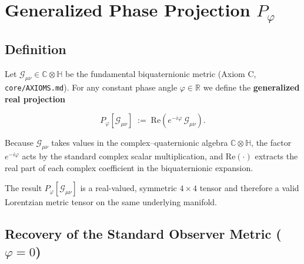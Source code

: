 

\section{Generalized Phase Projection $P_\varphi$}
\label{sec:canonical:phase_projection}

\subsection{Definition}

Let $\mathcal{G}_{\mu\nu} \in \mathbb{C} \otimes \mathbb{H}$ be the fundamental biquaternionic metric
(Axiom C, \texttt{core/AXIOMS.md}).  For any constant phase angle $\varphi \in \mathbb{R}$ we define
the \textbf{generalized real projection}

\begin{equation}
\label{eq:phase_projection_def}
\boxed{P_\varphi[\mathcal{G}_{\mu\nu}] \;:=\; \mathrm{Re}\!\left(e^{-i\varphi}\,\mathcal{G}_{\mu\nu}\right).}
\end{equation}

Because $\mathcal{G}_{\mu\nu}$ takes values in the complex–quaternionic algebra $\mathbb{C}\otimes\mathbb{H}$,
the factor $e^{-i\varphi}$ acts by the standard complex scalar multiplication, and $\mathrm{Re}(\cdot)$
extracts the real part of each complex coefficient in the biquaternionic expansion.

The result $P_\varphi[\mathcal{G}_{\mu\nu}]$ is a real-valued, symmetric $4\times 4$ tensor and therefore
a valid Lorentzian metric tensor on the same underlying manifold.

\subsection{Recovery of the Standard Observer Metric ($\varphi = 0$)}

